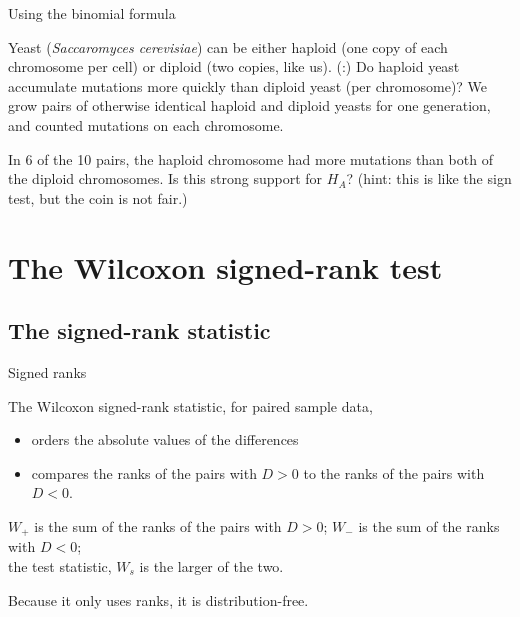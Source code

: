 \begin{frame}{Using the binomial formula}

  Yeast ({\it Saccaromyces cerevisiae}) can be either haploid (one copy of each chromosome per cell) or diploid (two copies, like us).
  (:) Do haploid yeast accumulate mutations more quickly than diploid yeast (per chromosome)?
  We grow pairs of otherwise identical haploid and diploid yeasts for one generation,
  and counted mutations on each chromosome.

    \vspace{2em}

    In 6 of the 10 pairs, the haploid chromosome had more mutations than both of the diploid chromosomes.
    Is this strong support for $H_A$? {\small (\alert{hint:} this is like the sign test, but the coin is not fair.) }


\end{frame}

\section{The Wilcoxon signed-rank test}

\subsection{The signed-rank statistic}

\begin{frame}{Signed ranks}

    The Wilcoxon signed-rank statistic, for paired sample data,
    \begin{itemize}
        \item orders the \alert{absolute values} of the differences
        \item compares the ranks of the pairs with $D>0$ to the ranks of the pairs with $D<0$.
    \end{itemize}

    \vspace{2em}

    $W_+$ is the sum of the ranks of the pairs with $D>0$; $W_-$ is the sum of the ranks with $D<0$; \\
    the \alert{test statistic}, $W_s$ is the larger of the two.

    \vspace{2em}

    Because it only uses \alert{ranks},
    it is distribution-free.

\end{frame}

